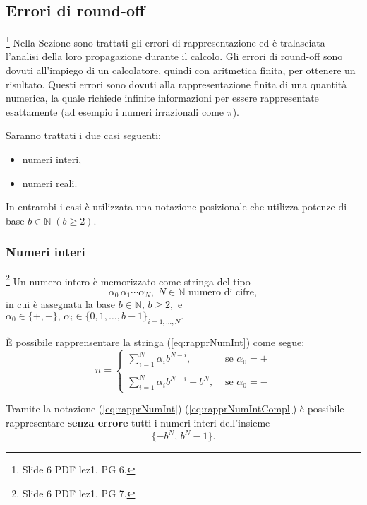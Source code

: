 \subsection{Errori di round-off}\label{ssec:errori_roundoff}\footnote{Slide 6 PDF lez1, PG 6.}
Nella Sezione sono trattati gli errori di rappresentazione ed è tralasciata l'analisi della loro propagazione durante il calcolo. Gli errori di round-off sono dovuti all'impiego di un calcolatore, quindi con aritmetica finita, per ottenere un risultato. Questi errori sono dovuti alla rappresentazione finita di una quantità numerica, la quale richiede infinite informazioni  per essere rappresentate esattamente (ad esempio i numeri irrazionali come $\pi$). 

Saranno trattati i due casi seguenti:
\begin{itemize}
	\item numeri interi,
	\item numeri reali.
\end{itemize}

In entrambi i casi è utilizzata una notazione posizionale che utilizza potenze di base $b\in\mathbb N\; (b\geq 2).$

\subsubsection{Numeri interi}\footnote{Slide 6 PDF lez1, PG 7.}
Un numero intero è memorizzato come stringa del tipo
\begin{equation}\label{eq:rapprNumInt}
	\alpha_0\,\alpha_1\cdots\alpha_N,\; N\in\mathbb N\text{ numero di cifre},
\end{equation}
in cui è assegnata la base $b\in\mathbb N,\, b\geq 2,$ e $ \alpha_0\in\{+,-\},\, \alpha_i\in\{0,1,\hdots, b-1\}_{i=1,\hdots,N}.$

È possibile rapprensentare la stringa (\ref{eq:rapprNumInt}) come segue:
\begin{equation}\label{eq:rapprNumIntCompl}
	n=\begin{cases}
		\sum_{i=1}^N\alpha_i b^{N-i}, &\text{ se } \alpha_0=+\\
		\\
		\sum_{i=1}^N\alpha_i b^{N-i} -b^N, &\text{ se } \alpha_0=-
	\end{cases}
\end{equation}

Tramite la notazione (\ref{eq:rapprNumInt})-(\ref{eq:rapprNumIntCompl}) è possibile rappresentare \textbf{senza errore} tutti i numeri interi dell'insieme
\begin{equation}\label{eq:insNumIntRappr}
	\{-b^N,\,b^N-1\}.
\end{equation}

